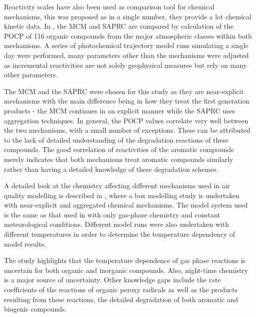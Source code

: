 Reactivity scales have also been used as comparison tool for chemical mechanisms, this was proposed as in a single number, they 
provide a lot chemical kinetic data. In \citep{Derwent:2010}, the MCM and SAPRC are compared by calculation of the POCP of 116 
organic compounds from the major atmospheric classes within both mechanisms. A series of photochemical trajectory model runs 
simulating a single day were performed, many parameters other than the mechanisms were adjusted as incremental reactivities are 
not solely geophysical measures but rely on many other parameters.

The MCM and the SAPRC were chosen for this study as they are near-explicit mechanisms with the main difference being in how they
treat the first generation products - the MCM continues in an explicit manner while the SAPRC uses aggregation techniques. In 
general, the POCP values correlate very well between the two mechanisms, with a small number of exceptions. These can be 
attributed to the lack of detailed understanding of the degradation reactions of these compounds. The good correlation of 
reactivities of the aromatic compounds merely indicates that both mechanisms treat aromatic compounds similarly rather than 
having a detailed knowledge of these degradation schemes.

A detailed look at the chemistry affecting different mechanisms used in air quality modelling is described in 
\citep{Stockwell:2012}, where a box modelling study is undertaken with near-explicit and aggregated chemical mechanisms. The 
model system used is the same as that used in \citep{Seefeld:1999} with only gas-phase chemistry and constant meteorological 
conditions.  Different model runs were also undertaken with different temperatures in order to determine the temperature 
dependency of model results. 

The study highlights that the temperature dependence of gas phase reactions is uncertain for both organic and inorganic 
compounds. Also, night-time chemistry is a major source of uncertainty. Other knowledge gaps include the rate coefficients of 
the reactions of organic peroxy radicals as well as the products resulting from these reactions, the detailed degradation of 
both aromatic and biogenic compounds.

